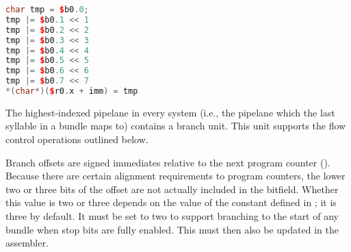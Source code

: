 \begin{lstlisting}[numbers=none, basicstyle=\ttfamily\footnotesize, language=C++]
char tmp = $b0.0;
tmp |= $b0.1 << 1
tmp |= $b0.2 << 2
tmp |= $b0.3 << 3
tmp |= $b0.4 << 4
tmp |= $b0.5 << 5
tmp |= $b0.6 << 6
tmp |= $b0.7 << 7
*(char*)($r0.x + imm) = tmp
\end{lstlisting}

The highest-indexed pipelane in every \rvex{} system (i.e., the pipelane which
the last syllable in a bundle maps to) contains a branch unit. This unit
supports the flow control operations outlined below.

Branch offsets are signed immediates relative to the next program counter
(). Because there are certain alignment requirements to program
counters, the lower two or three bits of the offset are not actually included
in the bitfield. Whether this value is two or three depends on the value of the
 constant defined in ; it
is three by default. It must be set to two to support branching to the start of
any bundle when stop bits are fully enabled. This must then also be updated in
the assembler.

